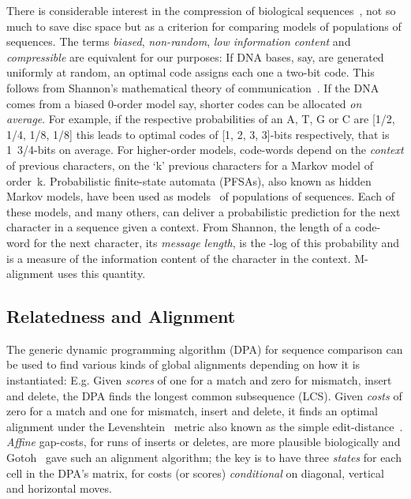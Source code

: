 \documentclass[letterpaper,11pt,oneside]{article}
\begin{document}
\begin{multicols}{2}
There is considerable interest in the compression of biological
sequences~\cite{grumbach94,loewenstern96,rivals97,allison00},
not so much to save disc space but
as a criterion for comparing models of populations of sequences.
The terms {\em biased}, {\em non-random}, {\em low information content}
and {\em compressible} are equivalent for our purposes:
If DNA bases, say, are generated uniformly at random, an optimal code
assigns each one a two-bit code.
This follows from
Shannon's mathematical theory of communication~\cite{shannon49}.
If the DNA comes from a biased 0-order model say,
shorter codes can be allocated {\em on average}.
For example, if the respective probabilities of an A, T, G or C are [1/2, 1/4,
1/8, 1/8] this leads to optimal codes of
[1, 2, 3, 3]-bits respectively, that is 1~3/4-bits on average.
For higher-order models, code-words depend on the {\em context}
of previous characters, on the `k' previous characters
for a Markov model of order~k.
Probabilistic finite-state automata (PFSAs),
also known as hidden Markov models,
have been used as models~\cite{georgeff84} of populations of sequences.
Each of these models, and many others, can deliver a probabilistic
prediction for the next character in a sequence given a context.
From Shannon, the length of a code-word for the next character,
its {\em message length}, is the -log of this probability and
is a measure of the information content of the character in the context.
M-alignment uses this quantity.


\subsection{Relatedness and Alignment} \label{sec:rel}

The generic dynamic programming algorithm (DPA) for
sequence comparison can be used to find various kinds
of global alignments depending on how it is instantiated: E.g.
Given {\em scores} of one for a match and zero for mismatch, insert and delete,
the DPA finds the longest common subsequence (LCS).
Given {\em costs} of zero for a match and one for mismatch, insert and delete,
it finds an optimal alignment under the Levenshtein~\cite{levenshtein66}
metric also known as the simple
edit-distance~\cite{sellers74}.
{\em Affine} gap-costs, for runs of inserts or deletes,
are more plausible biologically and Gotoh~\cite{gotoh82}
gave such an alignment algorithm; the key is to have three {\em states}
for each cell in the DPA's matrix, for costs (or scores)
{\em conditional} on diagonal, vertical and horizontal moves.


\end{multicols}
\end{document}
